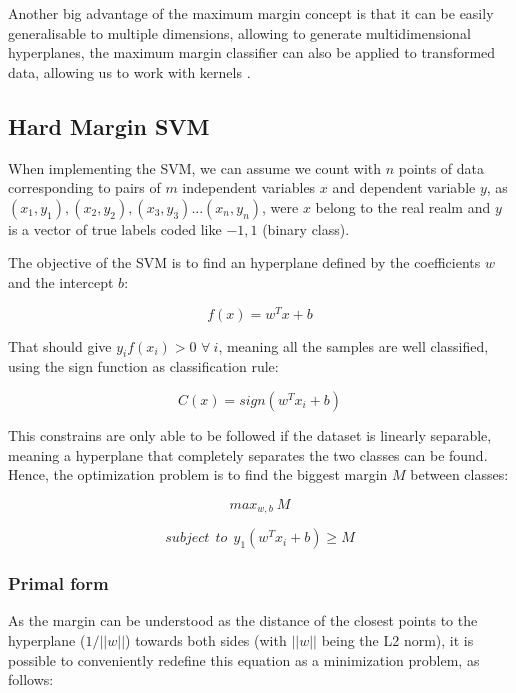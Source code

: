 \documentclass[11pt,twocolumn,letterpaper]{article}
\begin{document}
Another big advantage of the maximum margin concept is that it can be easily generalisable to multiple dimensions, allowing to generate multidimensional hyperplanes, the maximum margin classifier can also be applied to transformed data, allowing us to work with kernels \cite{Bishop2006}.

\subsection{Hard Margin SVM}

When implementing the SVM, we can assume we count with $n$ points of data corresponding to pairs of $m$ independent variables $x$ and dependent variable $y$, as $(x_1,y_1), (x_2,y_2), (x_3,y_3) ... (x_n,y_n)$, were $x$ belong to the real realm and $y$ is a vector of true labels coded like ${-1,1}$ (binary class).

The objective of the SVM is to find an hyperplane defined by the coefficients $w$ and the intercept $b$:

\begin{equation}
	f(x) = w^T x + b
\end{equation}

That should give $y_i f(x_i) > 0$ $\forall \: i$, meaning all the samples are well classified, using the sign function as classification rule:

\begin{equation}
	C(x) = sign(w^T x_i + b)
\end{equation}

This constrains are only able to be followed if the dataset is linearly separable, meaning a hyperplane that completely separates the two classes can be found. Hence, the optimization problem is to find the biggest margin $M$ between classes:

\begin{equation}
	max_{w,b} \: M
\end{equation}

\begin{equation}
	subject \:\:to  \:\: y_1(w^T x_i + b) \geq M
\end{equation}

\subsubsection{Primal form}

As the margin can be understood as the distance of the closest points to the hyperplane ($1/||w||$) towards both sides \cite{Hastie2009} (with $||w||$ being the L2 norm), it is possible to conveniently redefine this equation as a minimization problem, as follows:
\end{document}
